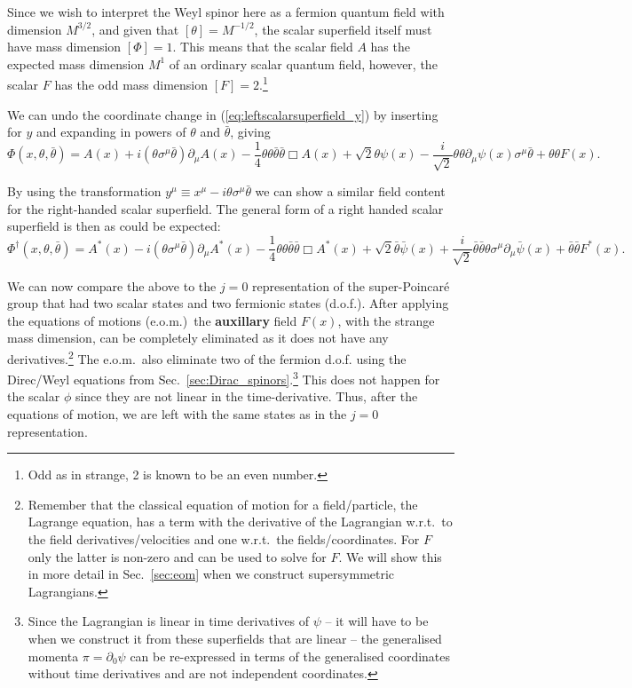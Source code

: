 \documentclass[notes.tex]{subfiles}
\begin{document}
Since we wish to interpret the Weyl spinor here as a fermion quantum field with dimension $M^{3/2}$, and given that $[\theta]=M^{-1/2}$, the scalar superfield itself must have mass dimension $[\Phi]=1$. This means that the scalar field $A$ has the expected mass dimension $M^1$ of an ordinary scalar quantum field, however, the scalar $F$ has the odd mass dimension $[F]=2$.\footnote{Odd as in strange, 2 is known to be an even number.}

We can undo the coordinate change in (\ref{eq:leftscalarsuperfield_y}) by inserting for $y$ and expanding in powers of $\theta$ and $\bar{\theta}$, giving
\begin{equation}
\Phi(x, \theta, \bar{\theta}) = A(x) + i(\theta\sigma^\mu \bar{\theta})\partial_\mu A(x) - \frac{1}{4}\theta\theta\bar{\theta}\bar{\theta}\Box A(x) + \sqrt{2}\theta \psi(x) - \frac{i}{\sqrt{2}}\theta\theta\partial_\mu \psi(x)\sigma^\mu\bar{\theta} + \theta\theta F(x).
\label{eq:leftscalarsuperfield}
\end{equation}

By using the transformation  $y^\mu \equiv x^\mu - i\theta\sigma^\mu \bar{\theta}$ we can show a similar field content for the right-handed scalar superfield. The general form of a right handed scalar superfield is then as could be expected:
\begin{equation}
\Phi^\dagger (x, \theta, \bar{\theta}) = A^*(x) - i(\theta\sigma^\mu \bar{\theta})\partial_\mu A^*(x) - \frac{1}{4}\theta\theta\bar{\theta}\bar{\theta}\Box A^*(x) + \sqrt{2}\bar{\theta}\bar{\psi}(x) + \frac{i}{\sqrt{2}}\bar{\theta}\bar{\theta}\theta \sigma^\mu\partial_\mu \bar{\psi}(x) +\bar{\theta}\bar{\theta} F^*(x).
\label{eq:rightscalarsuperfield}
\end{equation}

We can now compare the above to the $j=0$ representation of the super-Poincaré group that had two scalar states and two fermionic states (d.o.f.).  After applying the equations of motions (e.o.m.)\ the {\bf auxillary} field $F(x)$, with the strange mass dimension, can be completely eliminated as it does not have any derivatives.\footnote{Remember that the classical equation of motion for a field/particle, the Lagrange equation, has a term with the derivative of the Lagrangian w.r.t.\ to the field derivatives/velocities and one w.r.t.\ the fields/coordinates. For $F$ only the latter is non-zero and can be used to solve for $F$. We will show this in more detail in Sec.~\ref{sec:eom} when we construct supersymmetric Lagrangians.} The e.o.m.\ also eliminate two of the fermion d.o.f. using the Direc/Weyl equations from Sec.~\ref{sec:Dirac_spinors}.\footnote{Since the Lagrangian is linear in time derivatives of $\psi$ -- it will have to be  when we construct it from these superfields that are linear -- the generalised momenta $\pi=\partial_0\psi$ can be re-expressed in terms of the generalised coordinates without time derivatives and are not independent coordinates.} 
This does not happen for the scalar $\phi$ since they are not linear in the time-derivative. Thus, after the equations of motion, we are left with the same states as in the $j=0$ representation.
\end{document}
